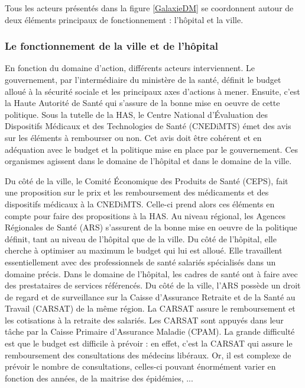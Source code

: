 Tous les acteurs présentés dans la figure \ref{GalaxieDM} se coordonnent autour de deux éléments principaux de fonctionnement : l'hôpital et la ville.


\subsubsection{Le fonctionnement de la ville et de l'hôpital}

En fonction du domaine d'action, différents acteurs interviennent. 
Le gouvernement, par l'intermédiaire du ministère de la santé, définit le budget alloué à la sécurité sociale et les principaux axes d'actions à mener.
Ensuite, c'est la Haute Autorité de Santé qui s'assure de la bonne mise en oeuvre de cette politique. Sous la tutelle de la HAS, le Centre National d'Évaluation des Dispositifs Médicaux et des Technologies de Santé (CNEDiMTS) émet des avis sur les éléments à rembourser ou non. Cet avis doit être cohérent et en adéquation avec le budget et la politique mise en place par le gouvernement. Ces organismes agissent dans le domaine de l'hôpital et dans le domaine de la ville.

Du côté de la ville, le Comité Économique des Produits de Santé (CEPS), fait une proposition sur le prix et les remboursement des médicaments et des dispositifs médicaux à la CNEDiMTS. Celle-ci prend alors ces éléments en compte pour faire des propositions à la HAS.
Au niveau régional, les Agences Régionales de Santé (ARS) s'assurent de la bonne mise en oeuvre de la politique définit, tant au niveau de l'hôpital que de la ville.
Du côté de l'hôpital, elle cherche à optimiser au maximum le budget qui lui est alloué. Elle travaillent essentiellement avec des professionnels de santé salariés spécialisés dans un domaine précis. Dans le domaine de l'hôpital, les cadres de santé ont à faire avec des prestataires de services référencés.
Du côté de la ville, l'ARS possède un droit de regard et de surveillance sur la Caisse d'Assurance Retraite et de la Santé au Travail (CARSAT) de la même région. La CARSAT assure le remboursement et les cotisations à la retraite des salariés. Les CARSAT sont appuyés dans leur tâche par la Caisse Primaire d'Assurance Maladie (CPAM). La grande difficulté est que le budget est difficile à prévoir : en effet, c'est la CARSAT qui assure le remboursement des consultations des médecins libéraux. Or, il est complexe de prévoir le nombre de consultations, celles-ci pouvant énormément varier en fonction des années, de la maitrise des épidémies, ...

